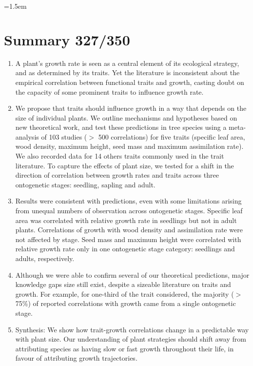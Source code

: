 \documentclass[a4paper,11pt]{article}
\date{}
\begin{document}
\mstitlepage
\noindent
\parindent=1.5em
\addtolength{\parskip}{.3em}
\doublespacing
\linenumbers
\section{Summary 327/350}\label{abstract}
\begin{enumerate}
\def\labelenumi{\arabic{enumi}.}
\itemsep1pt\parskip0pt
\item A plant's growth rate is seen as a central element of its ecological strategy, and as determined by its traits. Yet the literature is inconsistent about the empirical correlation between functional traits and growth, casting doubt on the capacity of some prominent traits to influence growth rate.

\item We propose that traits should influence growth in a way that depends on the size of individual plants. We outline mechanisms and hypotheses based on new theoretical work, and test these predictions in tree species using a meta-analysis of 103 studies ($>$ 500 correlations) for five traits (specific leaf area, wood density, maximum height, seed mass and maximum assimilation rate). We also recorded data for 14 others traits commonly used in the trait literature. To capture the effects of plant size, we tested for a shift in the direction of correlation between growth rates and traits across three ontogenetic stages: seedling, sapling and adult.

\item Results were consistent with predictions, even with some limitations arising from unequal numbers of observation across ontogenetic stages. Specific leaf area was correlated with relative growth rate in seedlings but not in adult plants. Correlations of growth with wood density and assimilation rate were not affected by stage. Seed mass and maximum height were correlated with relative growth rate only in one ontogenetic stage category: seedlings and adults, respectively.

\item Although we were able to confirm several of our theoretical predictions, major knowledge gaps size still exist, despite a sizeable literature on traits and growth. For example, for one-third of the trait considered, the majority ($>$ 75\%) of reported correlations with growth came from a single ontogenetic stage.

\item Synthesis: We show how trait-growth correlations change in a predictable way with plant size. Our understanding of plant strategies should shift away from attributing species as having slow or fast growth throughout their life, in favour of attributing growth trajectories.
\end{enumerate}
\end{document}
